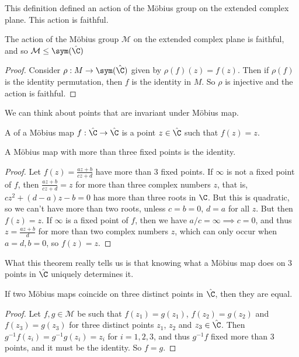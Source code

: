 \documentclass[a4]{scrreprt}
\begin{document}
This definition defined an action of the Möbius group on the extended complex plane. This action is faithful.

\begin{proposition}
	The action of the Möbius group $\mathcal{M}$ on the extended complex plane is faithful, and so $\mathcal{M} \leq \sym(\hat{\C})$
\end{proposition}
\begin{proof}
	Consider $\rho : M \rightarrow \sym(\hat{\C})$ given by $\rho(f)(z) = f(z)$. Then if $\rho(f)$ is the identity permutation, then $f$ is the identity in $M$. So $\rho$ is injective and the action is faithful.
\end{proof}

We can think about points that are invariant under Möbius map.

\begin{definition}
	A  of a Möbius map $f: \hat{\C} 	\rightarrow \hat{\C}$ is a point $z \in \hat{\C}$ such that $f(z) = z$.
\end{definition}

\begin{theorem}
	A Möbius map with more than three fixed points is the identity.
\end{theorem}
\begin{proof}
Let $f(z) = \frac{az + b}{cz + d}$ have more than 3 fixed points. If $\infty$ is not a fixed point of $f$, then $\frac{az + b}{cz + d} = z$ for more than three complex numbers $z$, that is, $cz^2 + (d - a)z - b = 0$ has more than three roots in $\C$. But this is quadratic, so we can't have more than two roots, unless $c = b = 0$, $d = a$ for all $z$. But then $f(z) = z$. If $\infty$ is a fixed point of $f$, then we have $a/c = \infty \implies c = 0$, and thus $z = \frac{az + b}{d}$ for more than two complex numbers $z$, which can only occur when $a = d, b = 0$, so $f(z) = z$.
\end{proof}

What this theorem really tells us is that knowing what a Möbius map does on 3 points in $\hat{\C}$ uniquely determines it.

\begin{corollary}
	If two Möbius maps coincide on three distinct points in $\hat{\C}$, then they are equal.
\end{corollary}
\begin{proof}
	Let $f, g \in \mathcal{M}$ be such that $f(z_1) = g(z_1)$, $f(z_2) = g(z_2)$ and $f(z_3) = g(z_3)$ for three distinct points $z_1$, $z_2$ and $z_3 \in \hat{\C}$. Then $g^{-1}f(z_i) = g^{-1} g(z_i) = z_i$ for $i = 1, 2, 3$, and thus $g^{-1}f$ fixed more than 3 points, and it must be the identity. So $f = g$.
\end{proof}
\end{document}
